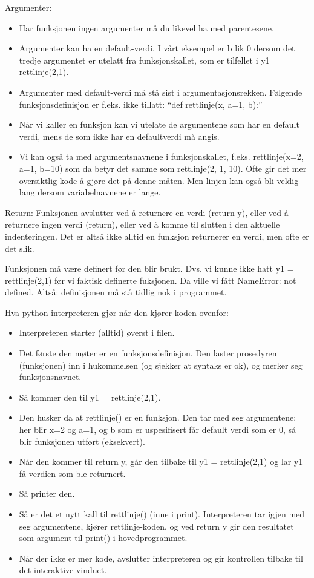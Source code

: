 Argumenter:
\begin{itemize}
\item Har funksjonen ingen argumenter må du likevel ha med parentesene. 
\item Argumenter kan ha en default-verdi. I vårt eksempel er b lik 0 dersom det tredje argumentet er utelatt fra funksjonskallet, som er tilfellet i y1 = rettlinje(2,1).
\item Argumenter med default-verdi må stå sist i argumentasjonsrekken. Følgende funksjonsdefinisjon er f.eks. ikke tillatt:  ``def rettlinje(x, a=1, b):''
\item Når vi kaller en funksjon kan vi utelate de argumentene som har en default verdi, mens de som ikke har en defaultverdi må angis. 
\item Vi kan også ta med argumentsnavnene i funksjonskallet, f.eks. rettlinje(x=2, a=1, b=10) som da betyr det samme som rettlinje(2, 1, 10). Ofte gir det mer oversiktlig kode å gjøre det på denne måten. Men linjen kan også bli veldig lang dersom variabelnavnene er lange. 
\end{itemize}

Return: 
Funksjonen avslutter ved å returnere en verdi (return y), eller ved å returnere ingen verdi (return), eller ved å komme til slutten i den aktuelle indenteringen. Det er altså ikke alltid en funksjon returnerer en verdi, men ofte er det slik. 

Funksjonen må være definert før den blir brukt. Dvs. vi kunne ikke hatt y1 = rettlinje(2,1) før vi faktisk definerte fuksjonen. Da ville vi fått NameError: not defined. Altså: definisjonen må stå tidlig nok i programmet. 

Hva python-interpreteren gjør når den kjører koden ovenfor:
\begin{itemize}
\item Interpreteren starter (alltid) øverst i filen.
\item Det første den møter er en funksjonsdefinisjon. Den laster prosedyren (funksjonen) inn i hukommelsen (og sjekker at syntaks er ok), og merker seg funksjonsnavnet. 
\item Så kommer den til y1 = rettlinje(2,1).
\item Den husker da at rettlinje() er en funksjon. Den tar med seg argumentene: her blir x=2 og a=1, og b som er uspesifisert får default verdi som er 0, så blir funksjonen utført (eksekvert). 
\item Når den kommer til return y, går den tilbake til y1 = rettlinje(2,1) og lar y1 få verdien som ble returnert.
\item Så printer den. 
\item Så er det et nytt kall til rettlinje() (inne i print). Interpreteren tar igjen med seg argumentene, kjører rettlinje-koden, og ved return y gir den resultatet som argument til print() i hovedprogrammet.
\item Når der ikke er mer kode, avslutter interpreteren og gir kontrollen tilbake til det interaktive vinduet. 
\end{itemize}

